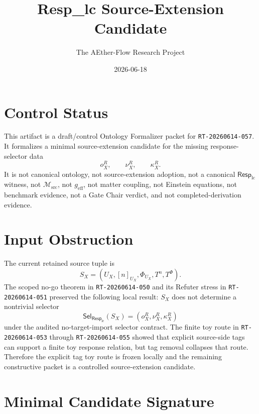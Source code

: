 \documentclass[11pt]{article}
\title{Resp\_lc Source-Extension Candidate}
\author{The AEther-Flow Research Project}
\date{2026-06-18}
\newcommand{\RespLC}{\mathsf{Resp}_{\mathrm{lc}}}
\newcommand{\SelResp}{\mathsf{Sel}_{\RespLC}}
\newcommand{\Msrc}{\mathcal{M}_{\mathrm{src}}}
\newcommand{\geff}{g_{\mathrm{eff}}}
\newcommand{\SX}{S_X}
\begin{document}
\maketitle

\section*{Control Status}

This artifact is a draft/control Ontology Formalizer packet for
\texttt{RT-20260614-057}. It formalizes a minimal source-extension
candidate for the missing response-selector data
\[
  o_X^R,\qquad \nu_X^R,\qquad \kappa_X^R .
\]
It is not canonical ontology, not source-extension adoption, not a
canonical \(\RespLC\) witness, not \(\Msrc\), not \(\geff\), not matter
coupling, not Einstein equations, not benchmark evidence, not a Gate
Chair verdict, and not completed-derivation evidence.

\section{Input Obstruction}

The current retained source tuple is
\[
  \SX=(U_X,[n]_{U_X},\Phi_{U_X},T^n,T^\Phi).
\]
The scoped no-go theorem in \texttt{RT-20260614-050} and its Refuter
stress in \texttt{RT-20260614-051} preserved the following local result:
\(\SX\) does not determine a nontrivial selector
\[
  \SelResp(\SX)=(o_X^R,\nu_X^R,\kappa_X^R)
\]
under the audited no-target-import selector contract. The finite toy
route in \texttt{RT-20260614-053} through \texttt{RT-20260614-055}
showed that explicit source-side tags can support a finite toy response
relation, but tag removal collapses that route. Therefore the explicit
tag toy route is frozen locally and the remaining constructive packet
is a controlled source-extension candidate.

\section{Minimal Candidate Signature}
\end{document}
